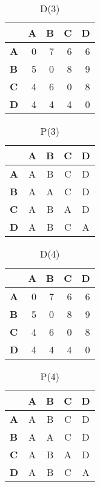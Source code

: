 \documentclass{article}
\begin{document}
\begin{table}[H]\centering
\caption{D(3)}
\begin{tabular}{l r r r r}
\toprule
 & \textbf{A} & \textbf{B} & \textbf{C} & \textbf{D}\\\midrule
\textbf{A} & 0 & 7 & 6 & 6 \\
\textbf{B} & 5 & 0 & 8 & 9 \\
\textbf{C} & 4 & 6 & 0 & 8 \\
\textbf{D} & 4 & 4 & 4 & 0 \\
\bottomrule
\end{tabular}
\end{table}

\begin{table}[H]\centering
\caption{P(3)}
\begin{tabular}{l c c c c}
\toprule
 & \textbf{A} & \textbf{B} & \textbf{C} & \textbf{D}\\\midrule
\textbf{A} & A & B & C & D \\
\textbf{B} & A & A & C & D \\
\textbf{C} & A & B & A & D \\
\textbf{D} & A & B & C & A \\
\bottomrule
\end{tabular}
\end{table}

\begin{table}[H]\centering
\caption{D(4)}
\begin{tabular}{l r r r r}
\toprule
 & \textbf{A} & \textbf{B} & \textbf{C} & \textbf{D}\\\midrule
\textbf{A} & 0 & 7 & 6 & 6 \\
\textbf{B} & 5 & 0 & 8 & 9 \\
\textbf{C} & 4 & 6 & 0 & 8 \\
\textbf{D} & 4 & 4 & 4 & 0 \\
\bottomrule
\end{tabular}
\end{table}

\begin{table}[H]\centering
\caption{P(4)}
\begin{tabular}{l c c c c}
\toprule
 & \textbf{A} & \textbf{B} & \textbf{C} & \textbf{D}\\\midrule
\textbf{A} & A & B & C & D \\
\textbf{B} & A & A & C & D \\
\textbf{C} & A & B & A & D \\
\textbf{D} & A & B & C & A \\
\bottomrule
\end{tabular}
\end{table}
\end{document}

